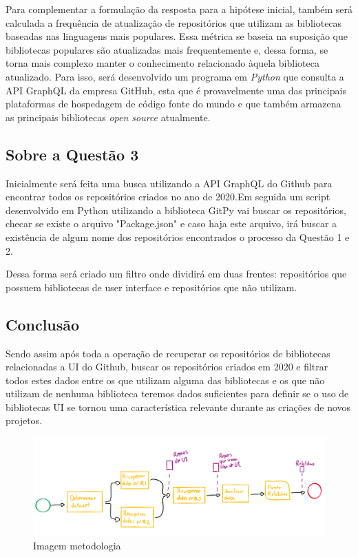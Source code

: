 \documentclass[12pt]{article}
\begin{document}
Para complementar a formulação da resposta para a hipótese inicial, também será calculada a frequência de atualização de repositórios que utilizam as bibliotecas baseadas nas linguagens mais populares. Essa métrica se baseia na suposição que bibliotecas populares são atualizadas mais frequentemente e, dessa forma, se torna mais complexo manter o conhecimento relacionado àquela biblioteca atualizado. Para isso, será desenvolvido um programa em \textit{Python} que consulta a API GraphQL da empresa GitHub, esta que é provavelmente uma das principais plataformas de hospedagem de código fonte do mundo e que também armazena as principais bibliotecas \textit{open source} atualmente.


\subsection{Sobre a Questão 3}
Inicialmente será feita uma busca utilizando a API GraphQL do Github para encontrar todos os repositórios criados no ano de 2020.Em seguida um script desenvolvido em Python utilizando a biblioteca GitPy vai buscar os repositórios, checar se existe o arquivo "Package.json" e caso haja este arquivo, irá buscar a existência de algum nome dos repositórios encontrados o processo da Questão 1 e 2. 

Dessa forma será criado um filtro onde dividirá em duas frentes: repositórios que possuem bibliotecas de user interface e repositórios que não utilizam.

\subsection{Conclusão}
Sendo assim após toda a operação de recuperar os repositórios de bibliotecas relacionadas a UI do Github, buscar os repositórios criados em 2020 e filtrar todos estes dados entre os que utilizam alguma das bibliotecas e os que não utilizam de nenhuma biblioteca teremos dados suficientes para definir se o uso de bibliotecas UI se tornou uma característica relevante durante as criações de novos projetos.  

\begin{figure}[ht]
\centering
\includegraphics[width=1\textwidth]{assets/metodologia.png}
\caption{Imagem metodologia}
\label{fig:metdologia}
\end{figure}
\end{document}
